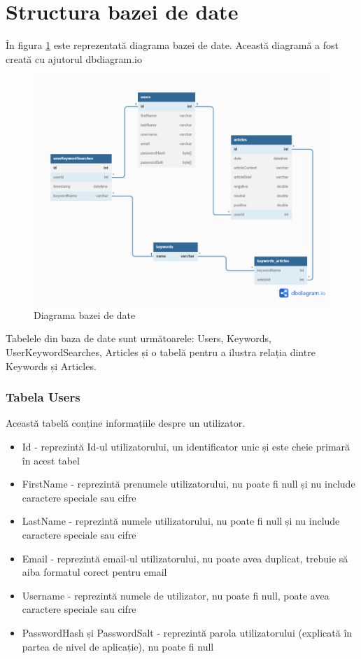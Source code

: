 \section{Structura bazei de date}
În figura \ref{fig:dbDiagram} este reprezentată diagrama bazei de date. Această diagramă a fost creată cu ajutorul dbdiagram.io~\cite{DbDiagram}
\begin{figure}[H]
	\centering
	\includegraphics[width=150mm]{figs/dbDiagram.png}
	\caption{Diagrama bazei de date}
	\label{fig:dbDiagram}
\end{figure}

Tabelele din baza de date sunt următoarele: Users, Keywords, UserKeywordSearches, Articles și o tabelă pentru a ilustra relația dintre Keywords și Articles.
\subsubsection{Tabela Users}
Această tabelă conține informațiile despre un utilizator.
\begin{itemize}
	\setlength\itemsep{0.5em}
	\item Id - reprezintă Id-ul utilizatorului, un identificator unic și este cheie primară în acest tabel
	\item FirstName - reprezintă prenumele utilizatorului, nu poate fi null și nu include caractere speciale sau cifre
	\item LastName - reprezintă numele utilizatorului, nu poate fi null și nu include caractere speciale sau cifre
	\item Email - reprezintă email-ul utilizatorului, nu poate avea duplicat, trebuie să aiba formatul corect pentru email
	\item Username - reprezintă numele de utilizator, nu poate fi null, poate avea caractere speciale sau cifre
	\item PasswordHash și PasswordSalt - reprezintă parola utilizatorului (explicată în partea de nivel de aplicație), nu poate fi null
\end{itemize}

